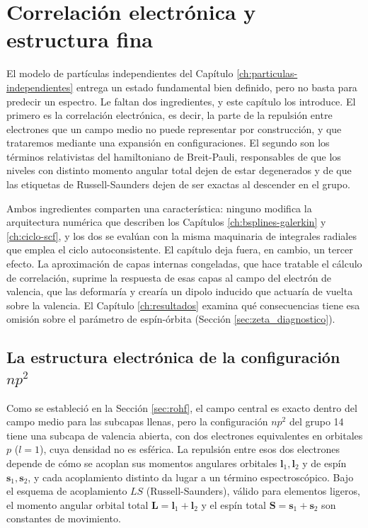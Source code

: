 \chapter{Correlación electrónica y estructura fina}
\label{ch:correlacion-estructura-fina}

El modelo de partículas independientes del Capítulo \ref{ch:particulas-independientes} entrega un estado fundamental bien definido, pero no basta para predecir un espectro. Le faltan dos ingredientes, y este capítulo los introduce. El primero es la correlación electrónica, es decir, la parte de la repulsión entre electrones que un campo medio no puede representar por construcción, y que trataremos mediante una expansión en configuraciones. El segundo son los términos relativistas del hamiltoniano de Breit-Pauli, responsables de que los niveles con distinto momento angular total dejen de estar degenerados y de que las etiquetas de Russell-Saunders dejen de ser exactas al descender en el grupo.

Ambos ingredientes comparten una característica: ninguno modifica la arquitectura numérica que describen los Capítulos \ref{ch:bsplines-galerkin} y \ref{ch:ciclo-scf}, y los dos se evalúan con la misma maquinaria de integrales radiales que emplea el ciclo autoconsistente. El capítulo deja fuera, en cambio, un tercer efecto. La aproximación de capas internas congeladas, que hace tratable el cálculo de correlación, suprime la respuesta de esas capas al campo del electrón de valencia, que las deformaría y crearía un dipolo inducido que actuaría de vuelta sobre la valencia. El Capítulo \ref{ch:resultados} examina qué consecuencias tiene esa omisión sobre el parámetro de espín-órbita (Sección \ref{sec:zeta_diagnostico}).

\section{La estructura electrónica de la configuración \texorpdfstring{$np^2$}{np2}}
\label{sec:np2_structure}

Como se estableció en la Sección \ref{sec:rohf}, el campo central es exacto dentro del campo medio para las subcapas llenas, pero la configuración $np^2$ del grupo 14 tiene una subcapa de valencia abierta, con dos electrones equivalentes en orbitales $p$ ($l=1$), cuya densidad no es esférica. La repulsión entre esos dos electrones depende de cómo se acoplan sus momentos angulares orbitales $\mathbf{l}_1, \mathbf{l}_2$ y de espín $\mathbf{s}_1, \mathbf{s}_2$, y cada acoplamiento distinto da lugar a un término espectroscópico. Bajo el esquema de acoplamiento $LS$ (Russell-Saunders), válido para elementos ligeros, el momento angular orbital total $\mathbf{L} = \mathbf{l}_1 + \mathbf{l}_2$ y el espín total $\mathbf{S} = \mathbf{s}_1 + \mathbf{s}_2$ son constantes de movimiento.

